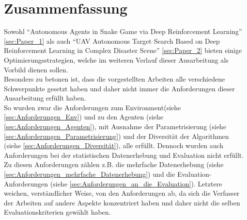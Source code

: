 \section{Zusammenfassung}
Sowohl "`Autonomous Agents in Snake Game via Deep Reinforcement Learning"' \ref{sec:Paper_1} als auch "`UAV Autonomous Target Search Based on Deep Reinforcement Learning in Complex Disaster Scene"' \ref{sec:Paper_2} bieten einige Optimierungsstrategien, welche im weiteren Verlauf dieser Ausarbeitung als Vorbild dienen sollen.\\
Besonders zu betonen ist, dass die vorgestellten Arbeiten alle verschiedene Schwerpunkte gesetzt haben und daher nicht immer die Anforderungen dieser Ausarbeitung erfüllt haben.\\ 
So wurden zwar die Anforderungen zum Environment(siehe \ref{sec:Anforderungen_Env}) und zu den Agenten (siehe \ref{sec:Anforderungen_Agenten}), mit Ausnahme der Parametrisierung (siehe \ref{sec:Anforderungen_Parametrisierung}) und der Diversität der Algorithmen (siehe \ref{sec:Anforderungen_Diversität}), alle erfüllt. Dennoch wurden auch Anforderungen bei der statistischen Datenerhebung und Evaluation nicht erfüllt. Zu diesen Anforderungen zählen z.B. die mehrfache Datenerhebung (siehe \ref{sec:Anforderungen_mehrfache_Datenerhebung}) und die Evaluation-Anforderungen (siehe \ref{sec:Anforderungen_an_die_Evaluation}). Letztere weichen, verständlicher Weise, von den Anforderungen ab, da sich die Verfasser der Arbeiten auf andere Aspekte konzentriert haben und daher nicht die selben Evaluationskriterien gewählt haben.
